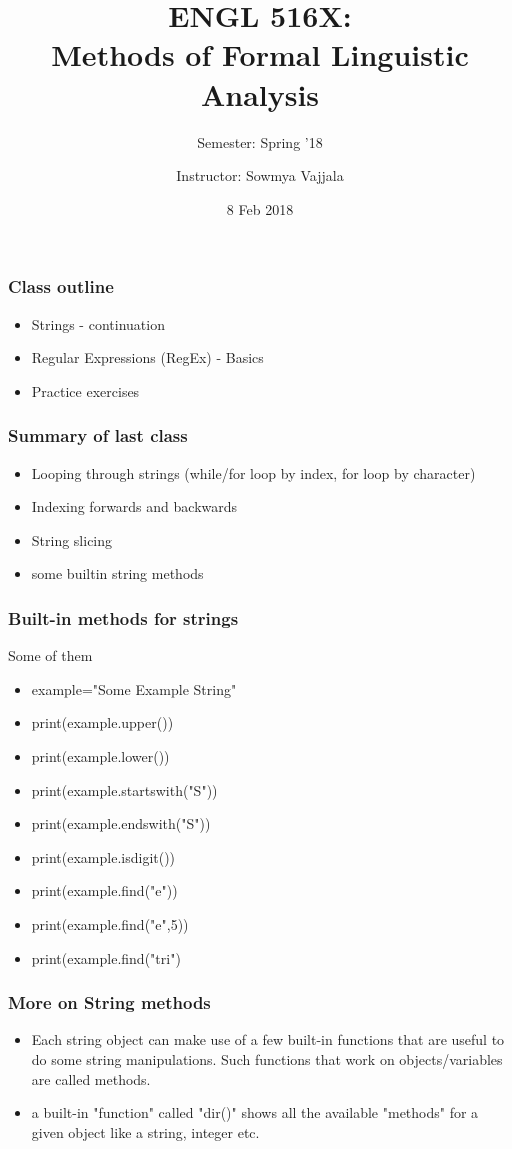 \documentclass{beamer}
\author[Sowmya Vajjala]{Instructor: Sowmya Vajjala}
\title[ENGL 516X]{ENGL 516X: \\ Methods of Formal Linguistic Analysis}
\subtitle{Semester: Spring '18}
\date{8 Feb 2018}
\institute{Iowa State University, USA}
\begin{document}
\begin{frame}\titlepage
\end{frame}

\begin{frame}%
\frametitle{Class outline}
\begin{itemize}
\item Strings - continuation
\item Regular Expressions (RegEx) - Basics
\item Practice exercises
\end{itemize}
\end{frame}

\begin{frame}
\frametitle{Summary of last class}
\begin{itemize}
\item Looping through strings (while/for loop by index, for loop by character)
\item Indexing forwards and backwards
\item String slicing
\item some builtin string methods
\end{itemize}
\end{frame}

\begin{frame} %
\frametitle{Built-in methods for strings}
Some of them
\begin{itemize}
\item example="Some Example String"
\item print(example.upper())
\item print(example.lower())
\item print(example.startswith("S"))
\item print(example.endswith("S"))
\item print(example.isdigit())
\item print(example.find("e"))
\item print(example.find("e",5))
\item print(example.find("tri")
\end{itemize}
\end{frame}

\begin{frame}
\frametitle{More on String methods}
\begin{itemize}
\item Each string object can make use of a few built-in functions that are useful to do some string manipulations. Such functions that work on objects/variables are called methods.
\item a built-in "function" called "dir()" shows all the available "methods" for a given object like a string, integer etc.
\end{itemize}
\end{frame}
\end{document}
